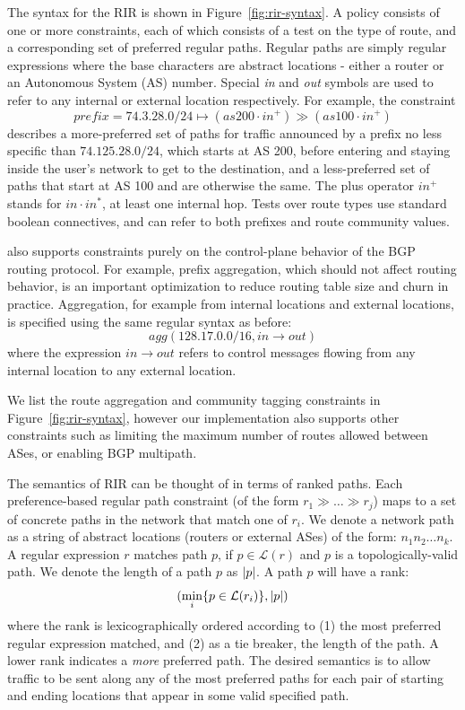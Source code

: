 
The syntax for the RIR is shown in Figure~\ref{fig:rir-syntax}. A policy consists of one or more constraints, each of which consists of a test on the type of route, and a corresponding set of preferred regular paths. Regular paths are simply regular expressions where the base characters are abstract locations - either a router or an Autonomous System (AS) number. Special \textit{in} and \textit{out} symbols are used to refer to any internal or external location respectively.
For example, the constraint
$$prefix=74.3.28.0/24 \mapsto (as200 \cdot in^+) \gg (as100 \cdot in^+)$$
describes a more-preferred set of paths for traffic announced by a prefix no less specific than $74.125.28.0/24$, which starts at AS 200, before entering and staying inside the user's network to get to the destination, and a less-preferred set of paths that start at AS 100 and are otherwise the same. The plus operator $in^+$ stands for $in \cdot in^*$, at least one internal hop. Tests over route types use standard boolean connectives, and can refer to both prefixes and route community values.

\sysname also supports constraints purely on the control-plane behavior of the BGP routing protocol. For example, prefix aggregation, which should not affect routing behavior, is an important optimization to reduce routing table size and churn in practice. Aggregation, for example from internal locations and external locations, is specified using the same regular syntax as before:
$$agg(128.17.0.0/16, in \rightarrow out)$$
where the expression $in \rightarrow out$ refers to control messages flowing from any internal location to any external location.

We list the route aggregation and community tagging constraints in Figure~\ref{fig:rir-syntax}, however our implementation also supports other constraints such as limiting the maximum number of routes allowed between ASes, or enabling BGP multipath.



The semantics of RIR can be thought of in terms of ranked paths. Each preference-based regular path constraint (of the form $r_1 \gg \dots \gg r_j$) maps to a set of concrete paths in the network that match one of $r_i$. We denote a network path as a string of abstract locations (routers or external ASes) of the form: $n_1 n_2 \dots n_k$. A regular expression $r$ matches path $p$, if $p \in \mathcal{L}(r)$ and $p$ is a topologically-valid path. We denote the length of a path $p$ as $ \lvert p \rvert $. A path $p$ will have a rank:
$$(\min_i \{  p \in \mathcal{L}(r_i)  \} ,  \lvert p \rvert )$$
where the rank is lexicographically ordered according to (1) the most preferred regular expression matched, and (2) as a tie breaker, the length of the path. A lower rank indicates a \emph{more} preferred path. The desired semantics is to allow traffic to be sent along any of the most preferred paths for each pair of starting and ending locations that appear in some valid specified path.

